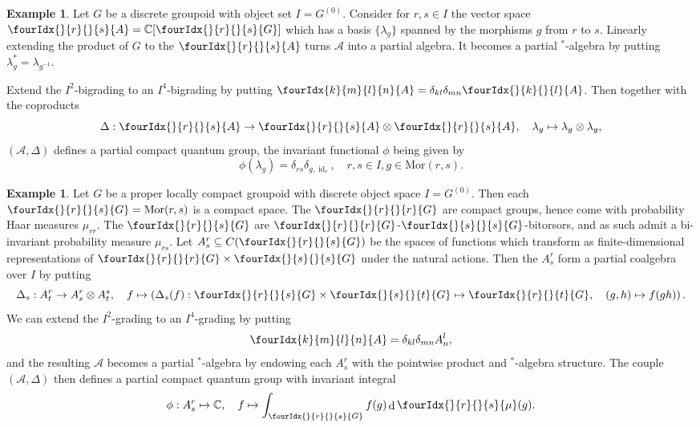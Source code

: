 \documentclass[11pt]{article}
\DeclareMathOperator{\id}{id}
\DeclareMathOperator{\rd}{\mathrm{d}}
\newcommand{\C}{\mathbb{C}}
\newcommand{\Mor}{\mathrm{Mor}}
\newcommand{\Gr}[5]{\fourIdx{#2}{#4}{#3}{#5}{#1}}%
\newcommand{\Gru}[3]{\Gr{#1}{}{}{#2}{#3}}
\theoremstyle{definition}
\newtheorem{Exa}[Theorem]{Example}
\numberwithin{equation}{section}
\begin{document}
\begin{Exa} Let $G$ be a discrete groupoid with object set $I = G^{(0)}$. Consider for $r,s\in I$ the vector space $\Gru{A}{r}{s}= \mathbb{C}\lbrack \Gru{G}{r}{s}\rbrack$ which has a basis $\{\lambda_g\}$ spanned by the morphisms $g$ from $r$ to $s$. Linearly extending the product of $G$ to the $\Gru{A}{r}{s}$ turns $\mathscr{A}$ into a partial algebra. It becomes a partial $^*$-algebra by putting $\lambda_g^* = \lambda_{g^{-1}}$. 

Extend the $I^2$-bigrading to an $I^4$-bigrading by putting $\Gr{A}{k}{l}{m}{n} = \delta_{kl}\delta_{mn}\Gru{A}{k}{l}$. Then together with the coproducts \[ \Delta: \Gru{A}{r}{s}\rightarrow \Gru{A}{r}{s}\otimes \Gru{A}{r}{s},\quad \lambda_g\mapsto \lambda_g\otimes \lambda_g,\] $(\mathscr{A},\Delta)$ defines a partial compact quantum group, the invariant functional $\phi$ being given by \[\phi(\lambda_g) = \delta_{rs}\delta_{g,\id_r},\quad r,s\in I,g\in \Mor(r,s).\]
\end{Exa}

\begin{Exa} Let $G$ be a proper locally compact groupoid with discrete object space $I=G^{(0)}$. Then each $\Gru{G}{r}{s} = \Mor(r,s)$ is a compact space. The $\Gru{G}{r}{r}$ are compact groups, hence come with probability Haar measures $\mu_{rr}$. The $\Gru{G}{r}{s}$ are $\Gru{G}{r}{r}$-$\Gru{G}{s}{s}$-bitorsors, and as such admit a bi-invariant probability measure $\mu_{rs}$. Let $A^r_s \subseteq C(\Gru{G}{r}{s})$ be the spaces of functions which transform as finite-dimensional representations of $\Gru{G}{r}{r}\times \Gru{G}{s}{s}$ under the natural actions. Then the $A^r_s$ form a partial coalgebra over $I$ by putting \[\Delta_{s}: A^r_t \rightarrow A^r_s\otimes A^s_t,\quad f\mapsto \left(\Delta_s(f):\Gru{G}{r}{s}\times \Gru{G}{s}{t}\mapsto \Gru{G}{r}{t},\quad (g,h)\mapsto f(gh)\right).\] We can extend the $I^2$-grading to an $I^4$-grading by putting \[\Gr{A}{k}{l}{m}{n} = \delta_{kl}\delta_{mn} A^l_n,\] and the resulting $\mathscr{A}$ becomes a partial $^*$-algebra by endowing each $A^r_s$ with the pointwise product and $^*$-algebra structure. The couple $(\mathscr{A},\Delta)$ then defines a partial compact quantum group with invariant integral \[\phi: A^r_s \mapsto \C,\quad f\mapsto \int_{\Gru{G}{r}{s}} f(g) \rd \Gru{\mu}{r}{s}(g).\]

\end{Exa}
\end{document}
